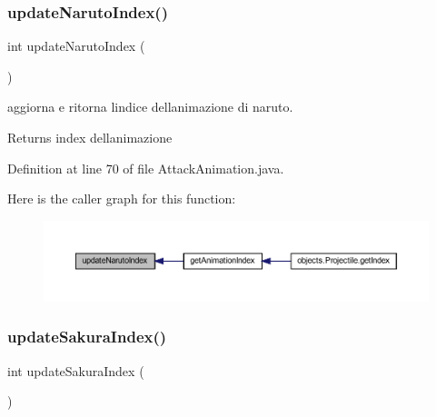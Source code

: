 \subsubsection{\texorpdfstring{update\+Naruto\+Index()}{updateNarutoIndex()}}
{\footnotesize\ttfamily int update\+Naruto\+Index (\begin{DoxyParamCaption}{ }\end{DoxyParamCaption})\hspace{0.3cm}{\ttfamily [private]}}



aggiorna e ritorna l\textquotesingle{}indice dell\textquotesingle{}animazione di naruto. 

\begin{DoxyReturn}{Returns}
index dell\textquotesingle{}animazione 
\end{DoxyReturn}


Definition at line 70 of file Attack\+Animation.\+java.

Here is the caller graph for this function\+:\nopagebreak
\begin{figure}[H]
\begin{center}
\leavevmode
\includegraphics[width=350pt]{classtowers_1_1_attack_animation_a9a43224ece8c2b408bea79a17a40926a_icgraph}
\end{center}
\end{figure}
\mbox{\label{classtowers_1_1_attack_animation_a1f8c2a2ac98f9746a0175442814aca4b}} 
\subsubsection{\texorpdfstring{update\+Sakura\+Index()}{updateSakuraIndex()}}
{\footnotesize\ttfamily int update\+Sakura\+Index (\begin{DoxyParamCaption}{ }\end{DoxyParamCaption})\hspace{0.3cm}{\ttfamily [private]}}



